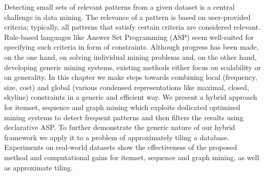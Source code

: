   Detecting small sets of relevant patterns from a given dataset is a central challenge in data mining. The relevance of a pattern is based on user-provided criteria; typically, all patterns that satisfy certain criteria are considered relevant. Rule-based languages like Answer Set Programming (ASP) seem well-suited for specifying such criteria in form of constraints.  Although progress has been made, on the one hand, on solving individual mining problems and, on the other hand, developing generic mining systems, existing methods either focus on scalability or on generality.  In this chapter we make steps towards combining local (frequency, size, cost) and global (various condensed representations like maximal, closed, skyline) constraints in a generic and efficient way. We present a hybrid approach for itemset, sequence and graph mining which exploits dedicated optimized mining systems to detect frequent patterns and then filters the results using declarative ASP. To further demonstrate the generic nature of our hybrid framework we apply it to a problem of approximately tiling a database. Experiments on real-world datasets show the effectiveness of the proposed method and computational gains 
for itemset, sequence and graph mining, as well as approximate tiling. 
